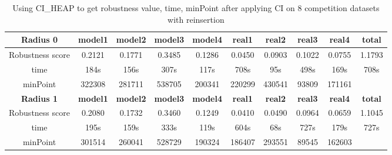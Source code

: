 \documentclass{article}
\begin{document}
	
	\begin{table}[]
	\begin{adjustwidth}{-1cm}{}		
		\begin{threeparttable}		
			\centering
			\caption{Using CI\_HEAP to get robustness value, time, minPoint after applying CI on 8 competition datasets with reinsertion}
			\label{tab:table7}
			\begin{tabular}{|c|c|c|c|c|c|c|c|c|c|}
				\hline
				\textbf{Radius 0} & \textbf{model1} & \textbf{model2} & \textbf{model3} & \textbf{model4} & \textbf{real1} & \textbf{real2} & \textbf{real3} & \textbf{real4} & \textbf{total} \\ \hline
				Robustness score                 & 0.2121          & 0.1771          & 0.3485          & 0.1286          & 0.0450         & 0.0903         & 0.1022         & 0.0755         & 1.1793         \\ \hline
				time                             & 184s            & 156s            & 307s            & 117s            & 708s           & 95s            & 498s           & 169s           & 708s           \\ \hline
				minPoint                         & 322308          & 281711          & 538705          & 200341          & 220299         & 430541         & 93809          & 171161         &                \\ \hline
				
				\textbf{Radius 1} & \textbf{model1} & \textbf{model2} & \textbf{model3} & \textbf{model4} & \textbf{real1} & \textbf{real2} & \textbf{real3} & \textbf{real4} & \textbf{total} \\ \hline
				Robustness score                 & 0.2080          & 0.1732          & 0.3460          & 0.1249          & 0.0410         & 0.0490         & 0.0964         & 0.0659         & 1.1045         \\ \hline
				time                             & 195s            & 159s            & 333s            & 119s            & 604s           & 68s            & 727s           & 179s           & 727s           \\ \hline
				minPoint                         & 301514          & 260041          & 528729          & 190324          & 186407         & 293551         & 89545          & 162603         &                \\ \hline
				

\end{tabular}
\end{threeparttable}
\end{adjustwidth}
\end{table}
\end{document}
